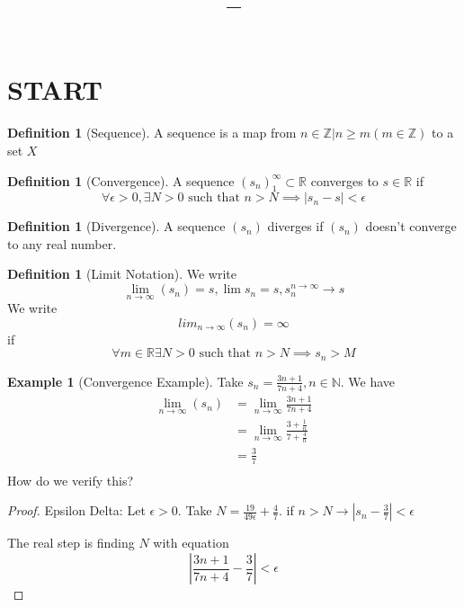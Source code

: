 \documentclass[11pt]{article}
\title{\vspace{-1.5em}\textbf{\coursename -- \lecturetitle}}
\author{\studentname}
\date{\lecturedate}
\newcommand{\1}{\mathbf{1}}
\theoremstyle{notestyle}
\theoremstyle{definition}
\newtheorem{definition}[theorem]{Definition}
\newtheorem{example}[theorem]{Example}
\begin{document}
\maketitle
\section{START}
\begin{definition}[Sequence]
\label{def:label}
A sequence is a map from ${n \in \mathbb{Z} | n \ge m}(m \in \mathbb{Z})$ to a set $X$
\end{definition}
\begin{definition}[Convergence]
\label{def:label}
A sequence $(s_n)_{1}^{\infty} \subset \mathbb{R} $ converges to $s \in \mathbb{R}$ if
$$\forall \epsilon > 0, \exists N > 0 \text{ such that }  n > N \implies |s_n - s| <
\epsilon$$
\begin{definition}[Divergence]
\label{def:label}
A sequence $(s_n)$ diverges if $(s_n)$ doesn't converge to any real number.
\end{definition}
\end{definition}
\begin{definition}[Limit Notation]
\label{def:label}
We write $$\lim_{n\rightarrow \infty}{(s_n)} = s, \lim s_n = s, s_n^{n \rightarrow \infty} \rightarrow s$$
We write $$lim_{n\rightarrow \infty}{(s_n)} = \infty$$
if $$\forall m \in \mathbb{R} \exists N > 0 \text { such that } n > N \implies s_n > M$$
\end{definition}
\begin{example}[Convergence Example]
\label{ex:label}
Take $s_n = \frac{3n+1}{7n+4}, n \in \mathbb{N}.$
We have 
\begin{align*}
    \lim_{n\rightarrow\infty}{(s_n)}
    &= \lim_{n\rightarrow\infty}{\frac{3n+1}{7n+4}}\\
    &= \lim_{n\rightarrow\infty}{\frac{3 + \frac{1}{n}}{7 + \frac{4}{n}}}\\
    &=  \frac{3}{7}\\
\end{align*}
How do we verify this?
\end{example}
\begin{proof}
    Epsilon Delta: Let $\epsilon > 0.$ Take $N = \frac{19}{49\epsilon}+\frac{4}{7}.$
    if $n > N \rightarrow |s_n - \frac{3}{7}| < \epsilon$
    \par The real step is finding $N$ with equation $$\left|
    \frac{3n+1}{7n+4}-\frac{3}{7}\right| < \epsilon$$
\end{proof}
\end{document}
